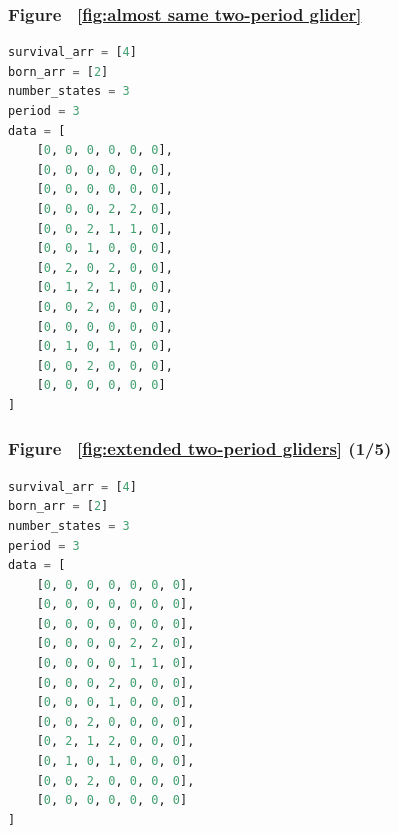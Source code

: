 \documentclass[12pt]{article}
\numberwithin{figure}{section} %
\begin{document}
\noindent\begin{minipage}{.45\textwidth}
\subsubsection{Figure ~\ref{fig:almost same two-period glider}}
\label{subsubsection:almost same two-period glider}
\begin{lstlisting}[language = Python]
survival_arr = [4]
born_arr = [2]
number_states = 3
period = 3
data = [
    [0, 0, 0, 0, 0, 0],
    [0, 0, 0, 0, 0, 0],
    [0, 0, 0, 0, 0, 0],
    [0, 0, 0, 2, 2, 0],
    [0, 0, 2, 1, 1, 0],
    [0, 0, 1, 0, 0, 0],
    [0, 2, 0, 2, 0, 0],
    [0, 1, 2, 1, 0, 0],
    [0, 0, 2, 0, 0, 0],
    [0, 0, 0, 0, 0, 0],
    [0, 1, 0, 1, 0, 0],
    [0, 0, 2, 0, 0, 0],
    [0, 0, 0, 0, 0, 0]
]
\end{lstlisting}
\end{minipage}\hfill
\begin{minipage}{.45\textwidth}
\subsubsection{Figure ~\ref{fig:extended two-period gliders} (1/5)}
\label{subsubsection:extended two-period gliders(1/5)}
\begin{lstlisting}[language = Python]
survival_arr = [4]
born_arr = [2]
number_states = 3
period = 3
data = [
    [0, 0, 0, 0, 0, 0, 0],
    [0, 0, 0, 0, 0, 0, 0],
    [0, 0, 0, 0, 0, 0, 0],
    [0, 0, 0, 0, 2, 2, 0],
    [0, 0, 0, 0, 1, 1, 0],
    [0, 0, 0, 2, 0, 0, 0],
    [0, 0, 0, 1, 0, 0, 0],
    [0, 0, 2, 0, 0, 0, 0],
    [0, 2, 1, 2, 0, 0, 0],
    [0, 1, 0, 1, 0, 0, 0],
    [0, 0, 2, 0, 0, 0, 0],
    [0, 0, 0, 0, 0, 0, 0]
]

\end{lstlisting}
\end{minipage}
\end{document}
